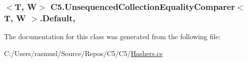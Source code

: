 \subsubsection[{Default}]{$<$T, W$>$ {\bf C5.\+Unsequenced\+Collection\+Equality\+Comparer}$<$ T, W $>$.Default\hspace{0.3cm}{\ttfamily [static]}, {\ttfamily [get]}}\label{class_c5_1_1_unsequenced_collection_equality_comparer_a5cb2337d8b46df120435c7476cd6fe9a}






The documentation for this class was generated from the following file\+:\begin{DoxyCompactItemize}
\item 
C\+:/\+Users/rasmusl/\+Source/\+Repos/\+C5/\+C5/\hyperlink{_hashers_8cs}{Hashers.\+cs}\end{DoxyCompactItemize}
